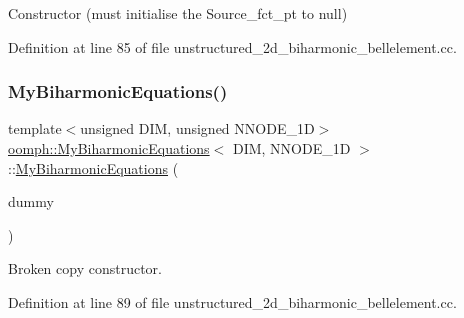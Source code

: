 Constructor (must initialise the Source\+\_\+fct\+\_\+pt to null) 



Definition at line 85 of file unstructured\+\_\+2d\+\_\+biharmonic\+\_\+bellelement.\+cc.

\mbox{\label{classoomph_1_1MyBiharmonicEquations_a3cf0e0a63e46219b94195aa4ab926316}} 
\subsubsection{\texorpdfstring{My\+Biharmonic\+Equations()}{MyBiharmonicEquations()}\hspace{0.1cm}{\footnotesize\ttfamily [2/4]}}
{\footnotesize\ttfamily template$<$unsigned D\+IM, unsigned N\+N\+O\+D\+E\+\_\+1D$>$ \\
\hyperlink{classoomph_1_1MyBiharmonicEquations}{oomph\+::\+My\+Biharmonic\+Equations}$<$ D\+IM, N\+N\+O\+D\+E\+\_\+1D $>$\+::\hyperlink{classoomph_1_1MyBiharmonicEquations}{My\+Biharmonic\+Equations} (\begin{DoxyParamCaption}\item[{const \hyperlink{classoomph_1_1MyBiharmonicEquations}{My\+Biharmonic\+Equations}$<$ D\+IM, N\+N\+O\+D\+E\+\_\+1D $>$ \&}]{dummy }\end{DoxyParamCaption})\hspace{0.3cm}{\ttfamily [inline]}}



Broken copy constructor. 



Definition at line 89 of file unstructured\+\_\+2d\+\_\+biharmonic\+\_\+bellelement.\+cc.

\mbox{\label{classoomph_1_1MyBiharmonicEquations_ab5084decf9d75cee91f0e88fb4f62c86}} 
